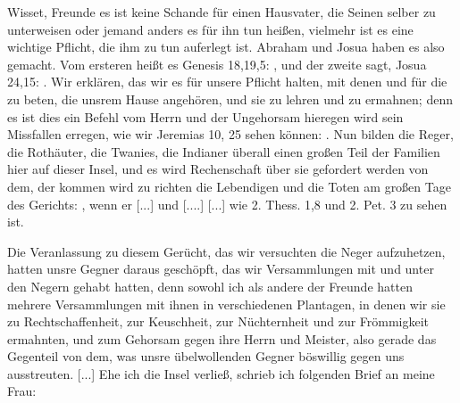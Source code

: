 {  Wisset, Freunde es ist keine Schande für einen Hausvater,
  die Seinen selber zu unterweisen oder jemand anders es für ihn
  tun heißen, vielmehr ist es eine wichtige Pflicht, die ihm zu
  tun auferlegt ist. Abraham und Josua haben es also gemacht.
  Vom ersteren heißt es Genesis 18,19,5: ,
  und der zweite sagt, Josua 24,15: 
  . Wir erklären, das wir es für unsere Pflicht halten,
  mit denen und für die zu beten, die unsrem Hause angehören,
  und sie zu lehren und zu ermahnen; denn es ist dies ein Befehl
  vom Herrn und der Ungehorsam hieregen wird sein Missfallen
  erregen, wie wir Jeremias 10, 25 
  sehen können: . Nun bilden die
  Reger, die Rothäuter, die Twanies, 
  die Indianer überall einen
  großen Teil der Familien hier auf dieser Insel, und es wird 
  Rechenschaft über sie gefordert werden von dem, der kommen wird zu
  richten die Lebendigen und die Toten am großen Tage des
  Gerichts: , wenn er  [...] und  [....]  [...]
  wie 2. Thess. 1,8 und 
  2. Pet. 3 zu sehen ist.
}


Die Veranlassung zu diesem Gerücht, das wir versuchten die
Neger aufzuhetzen, hatten unsre Gegner daraus geschöpft, das
wir Versammlungen mit und unter den Negern gehabt hatten,
denn sowohl ich als andere der Freunde hatten mehrere 
Versammlungen mit ihnen in verschiedenen Plantagen, in denen wir
sie zu Rechtschaffenheit, zur Keuschheit, zur Nüchternheit und zur
Frömmigkeit ermahnten, und zum Gehorsam gegen ihre Herrn
und Meister, also gerade das Gegenteil von dem, was unsre
übelwollenden Gegner böswillig gegen uns ausstreuten. [...]
Ehe ich die Insel verließ, schrieb ich folgenden Brief an
meine Frau:

